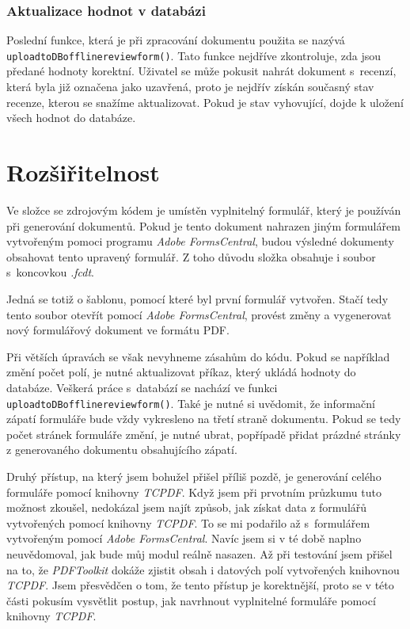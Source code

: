 \documentclass[czech,BP]{thesiskiv}
\begin{document}
\subsection{Aktualizace hodnot v databázi}
\sloppy
Poslední funkce, která je při zpracování dokumentu použita se nazývá \texttt{upload\textunderscore to\textunderscore DB\textunderscore offline\textunderscore review\textunderscore form()}. Tato funkce nejdříve zkontroluje, zda jsou předané hodnoty korektní. Uživatel se může pokusit nahrát dokument s~recenzí, která byla již označena jako uzavřená, proto je nejdřív získán současný stav recenze, kterou se snažíme aktualizovat. Pokud je stav vyhovující, dojde k uložení všech hodnot do databáze. 
\chapter{Rozšiřitelnost}
Ve složce se zdrojovým kódem je umístěn vyplnitelný formulář, který je používán při generování dokumentů. Pokud je tento dokument nahrazen jiným formulářem vytvořeným pomoci programu \emph{Adobe FormsCentral}, budou výsledné dokumenty obsahovat tento upravený formulář. Z toho důvodu složka obsahuje i soubor s~koncovkou \emph{.fcdt}.

Jedná se totiž o šablonu, pomocí které byl první formulář vytvořen. Stačí tedy tento soubor otevřít pomocí \emph{Adobe FormsCentral}, provést změny a vygenerovat nový formulářový dokument ve formátu PDF. 
\sloppy

Při větších úpravách se však nevyhneme zásahům do kódu. Pokud se například změní počet polí, je nutné aktualizovat příkaz, který ukládá hodnoty do databáze. Veškerá práce s~databází se nachází ve funkci \texttt{upload\textunderscore to\textunderscore DB\textunderscore offline\textunderscore review\textunderscore form()}. Také je nutné si uvědomit, že informační zápatí formuláře bude vždy vykresleno na třetí straně dokumentu. Pokud se tedy počet stránek formuláře změní, je nutné ubrat, popřípadě přidat prázdné stránky z generovaného dokumentu obsahujícího zápatí.

Druhý přístup, na který jsem bohužel přišel příliš pozdě, je generování celého formuláře pomocí knihovny \emph{TCPDF}. Když jsem při prvotním průzkumu tuto možnost zkoušel, nedokázal jsem najít způsob, jak získat data z formulářů vytvořených pomocí knihovny \emph{TCPDF}. To se mi podařilo až s~formulářem vytvořeným pomocí \emph{Adobe FormsCentral}. Navíc jsem si v té době naplno neuvědomoval, jak bude můj modul reálně nasazen. Až při testování jsem přišel na to, že \emph{PDFToolkit} dokáže zjistit obsah i datových polí vytvořených knihovnou \emph{TCPDF}. Jsem přesvědčen o tom, že tento přístup je korektnější, proto se v této části pokusím vysvětlit postup, jak navrhnout vyplnitelné formuláře pomocí knihovny \emph{TCPDF}.
\end{document}
